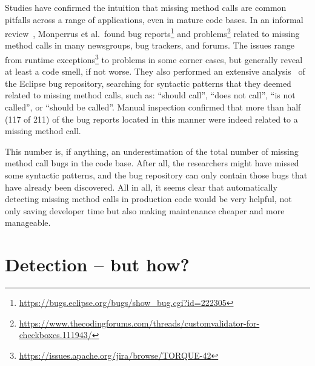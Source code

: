Studies have confirmed the intuition that missing method calls are common pitfalls across a range of applications, even in mature code bases.
In an informal review~\cite{monperrus2010detecting}, Monperrus et al.\ found bug reports\footnote{\url{https://bugs.eclipse.org/bugs/show_bug.cgi?id=222305}} and problems\footnote{\url{https://www.thecodingforums.com/threads/customvalidator-for-checkboxes.111943/}} related to missing method calls in many newsgroups, bug trackers, and forums.
The issues range from runtime exceptions\footnote{\url{https://issues.apache.org/jira/browse/TORQUE-42}} to problems in some corner cases, but generally reveal at least a code smell, if not worse.
They also performed an extensive analysis~\cite{monperrus2013detecting} of the Eclipse bug repository,
searching for syntactic patterns that they deemed related to missing method calls, such as: ``should call'', ``does not call'', ``is not called'', or ``should be called''.
Manual inspection confirmed that more than half (117 of 211) of the bug reports located in this manner were indeed related to a missing method call.

This number is, if anything, an underestimation of the total number of missing method call bugs in the code base.
After all, the researchers might have missed some syntactic patterns, and the bug repository can only contain those bugs that have already been discovered.
All in all, it seems clear that automatically detecting missing method calls in production code would be very helpful, not only saving developer time but also making maintenance cheaper and more manageable.

\section{Detection -- but how?}

